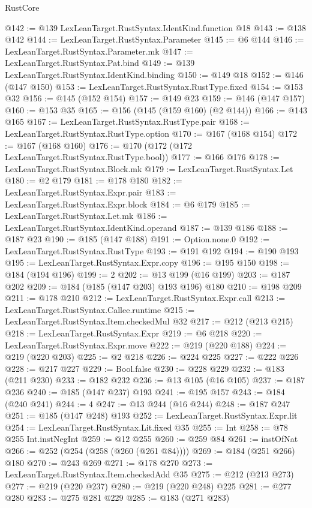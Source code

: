 \begin{lexlean}{RustCore}
\begin{coremodule}
@142 := @139 LexLeanTarget.RustSyntax.IdentKind.function @18
@143 := @138 @142
@144 := LexLeanTarget.RustSyntax.Parameter
@145 := @6 @144
@146 := LexLeanTarget.RustSyntax.Parameter.mk
@147 := LexLeanTarget.RustSyntax.Pat.bind
@149 := @139 LexLeanTarget.RustSyntax.IdentKind.binding
@150 := @149 @18
@152 := @146 (@147 @150)
@153 := LexLeanTarget.RustSyntax.RustType.fixed
@154 := @153 @32
@156 := @145 (@152 @154)
@157 := @149 @23
@159 := @146 (@147 @157)
@160 := @153 @35
@165 := @156 (@145 (@159 @160) (@2 @144))
@166 := @143 @165
@167 := LexLeanTarget.RustSyntax.RustType.pair
@168 := LexLeanTarget.RustSyntax.RustType.option
@170 := @167 (@168 @154)
@172 := @167 (@168 @160)
@176 := @170 (@172 (@172 LexLeanTarget.RustSyntax.RustType.bool))
@177 := @166 @176
@178 := LexLeanTarget.RustSyntax.Block.mk
@179 := LexLeanTarget.RustSyntax.Let
@180 := @2 @179
@181 := @178 @180
@182 := LexLeanTarget.RustSyntax.Expr.pair
@183 := LexLeanTarget.RustSyntax.Expr.block
@184 := @6 @179
@185 := LexLeanTarget.RustSyntax.Let.mk
@186 := LexLeanTarget.RustSyntax.IdentKind.operand
@187 := @139 @186
@188 := @187 @23
@190 := @185 (@147 @188)
@191 := Option.none.{0}
@192 := LexLeanTarget.RustSyntax.RustType
@193 := @191 @192
@194 := @190 @193
@195 := LexLeanTarget.RustSyntax.Expr.copy
@196 := @195 @150
@198 := @184 (@194 @196)
@199 := 2
@202 := @13 @199 (@16 @199)
@203 := @187 @202
@209 := @184 (@185 (@147 @203) @193 @196) @180
@210 := @198 @209
@211 := @178 @210
@212 := LexLeanTarget.RustSyntax.Expr.call
@213 := LexLeanTarget.RustSyntax.Callee.runtime
@215 := LexLeanTarget.RustSyntax.Item.checkedMul @32
@217 := @212 (@213 @215)
@218 := LexLeanTarget.RustSyntax.Expr
@219 := @6 @218
@220 := LexLeanTarget.RustSyntax.Expr.move
@222 := @219 (@220 @188)
@224 := @219 (@220 @203)
@225 := @2 @218
@226 := @224 @225
@227 := @222 @226
@228 := @217 @227
@229 := Bool.false
@230 := @228 @229
@232 := @183 (@211 @230)
@233 := @182 @232
@236 := @13 @105 (@16 @105)
@237 := @187 @236
@240 := @185 (@147 @237) @193
@241 := @195 @157
@243 := @184 (@240 @241)
@244 := 4
@247 := @13 @244 (@16 @244)
@248 := @187 @247
@251 := @185 (@147 @248) @193
@252 := LexLeanTarget.RustSyntax.Expr.lit
@254 := LexLeanTarget.RustSyntax.Lit.fixed @35
@255 := Int
@258 := @78 @255 Int.instNegInt
@259 := @12 @255
@260 := @259 @84
@261 := instOfNat
@266 := @252 (@254 (@258 (@260 (@261 @84))))
@269 := @184 (@251 @266) @180
@270 := @243 @269
@271 := @178 @270
@273 := LexLeanTarget.RustSyntax.Item.checkedAdd @35
@275 := @212 (@213 @273)
@277 := @219 (@220 @237)
@280 := @219 (@220 @248) @225
@281 := @277 @280
@283 := @275 @281 @229
@285 := @183 (@271 @283)

\end{coremodule}
\end{lexlean}
